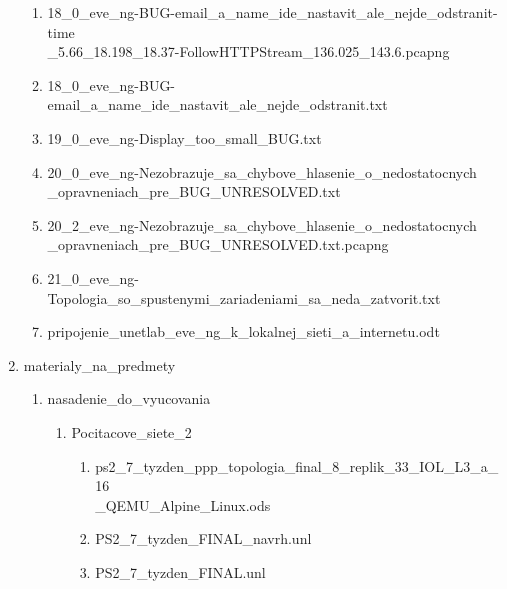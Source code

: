 \begin{enumerate}[noitemsep,label*=\thesection.\arabic*.]
\begin{enumerate}[noitemsep,label*=\arabic*.]
        \item 18\_0\_eve\_ng-BUG-email\_a\_name\_ide\_nastavit\_ale\_nejde\_odstranit-time\\\_5.66\_18.198\_18.37-FollowHTTPStream\_136.025\_143.6.pcapng
        \item \label{item:mail_meno_nejde_odstranit} 18\_0\_eve\_ng-BUG-email\_a\_name\_ide\_nastavit\_ale\_nejde\_odstranit.txt
        \item \label{item:display_too_small} 19\_0\_eve\_ng-Display\_too\_small\_BUG.txt
        \item \label{item:nezobrazene_chybove_hlasenie} 20\_0\_eve\_ng-Nezobrazuje\_sa\_chybove\_hlasenie\_o\_nedostatocnych\\\_opravneniach\_pre\_BUG\_UNRESOLVED.txt
        \item \label{item:nezobrazene_chybove_hlasenie_pcap} 20\_2\_eve\_ng-Nezobrazuje\_sa\_chybove\_hlasenie\_o\_nedostatocnych\\\_opravneniach\_pre\_BUG\_UNRESOLVED.txt.pcapng
        \item \label{item:zatvorenie_topologie_so_spustenymi_zariadeniami} 21\_0\_eve\_ng-Topologia\_so\_spustenymi\_zariadeniami\_sa\_neda\_zatvorit.txt
        \item pripojenie\_unetlab\_eve\_ng\_k\_lokalnej\_sieti\_a\_internetu.odt
    \end{enumerate}
    
    \item materialy\_na\_predmety
    
    \begin{enumerate}[noitemsep,label*=\arabic*.]
        \item nasadenie\_do\_vyucovania
        
        \begin{enumerate}[noitemsep,label*=\arabic*.]
            \item Pocitacove\_siete\_2
            
            \begin{enumerate}[noitemsep,label*=\arabic*.]
                \item \label{item:nasadenie_ps2_benchmark} ps2\_7\_tyzden\_ppp\_topologia\_final\_8\_replik\_33\_IOL\_L3\_a\_16\\\_QEMU\_Alpine\_Linux.ods
                \item PS2\_7\_tyzden\_FINAL\_navrh.unl
                \item PS2\_7\_tyzden\_FINAL.unl
            \end{enumerate}
        \end{enumerate}
        

\end{enumerate}
\end{enumerate}
